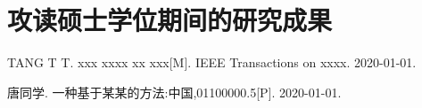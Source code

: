\chapter{攻读硕士学位期间的研究成果}


\begin{enumerate}[label = {[\arabic*]}]
    \item TANG T T. xxx xxxx xx xxx[M]. IEEE Transactions on xxxx. 2020-01-01.
    \item 唐同学. 一种基于某某的方法:中国,01100000.5[P]. 2020-01-01.
\end{enumerate}






